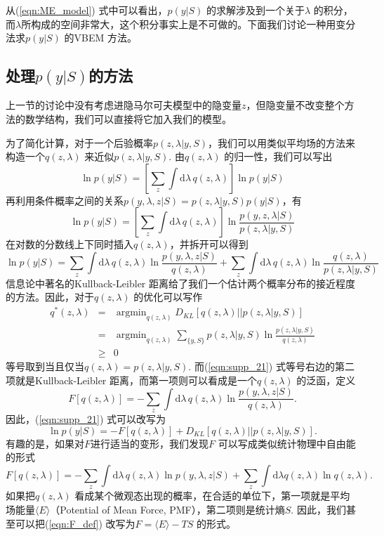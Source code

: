 \documentclass[11pt, a4paper]{article}
\DeclareMathOperator*{\argmin}{argmin}
\begin{document}
    从(\ref{eqn:ME_model}) 式中可以看出，$p(y|S)$ 的求解涉及到一个关于$\lambda$ 的积分，而$\lambda$所构成的空间非常大，这个积分事实上是不可做的。下面我们讨论一种用变分法求$p(y|S)$ 的VBEM 方法。

    \subsection{处理$p(y|S)$的方法}
    上一节的讨论中没有考虑进隐马尔可夫模型中的隐变量$z$，但隐变量不改变整个方法的数学结构，我们可以直接将它加入我们的模型。

    为了简化计算，对于一个后验概率$p(z,\lambda|y, S)$，我们可以用类似平均场的方法来构造一个$q(z,\lambda)$ 来近似$p(z,\lambda|y, S)$. 由$q(z,\lambda)$ 的归一性，我们可以写出
    $$\ln p(y|S) = \left[\sum_z\int \mathrm d\lambda\, q(z,\lambda)\right]\ln p(y|S)$$
    再利用条件概率之间的关系$p(y,\lambda,z|S) = p(z,\lambda|y, S)p(y|S)$，有
    $$\ln p(y|S) = \left[\sum_z\int \mathrm d\lambda\, q(z,\lambda)\right]\ln \frac{p(y,z,\lambda|S)}{p(z,\lambda|y,S)}$$
    在对数的分数线上下同时插入$q(z,\lambda)$，并拆开可以得到
    \begin{equation}\label{eqn:supp_21}
      \ln p(y|S) = \sum_z\int \mathrm d\lambda\, q(z,\lambda)\ln\frac{p(y,\lambda,z|S)}{q(z,\lambda)}+\sum_z\int \mathrm d\lambda\, q(z,\lambda)\ln\frac{q(z,\lambda)}{p(z,\lambda|y,S)}
    \end{equation}
    信息论中著名的Kullback-Leibler 距离给了我们一个估计两个概率分布的接近程度的方法。因此，对于$q(z,\lambda)$ 的优化可以写作
    \begin{eqnarray*}
      q^*(z,\lambda) &=& \argmin_{q(z,\lambda)} D_{KL}[q(z,\lambda) || p(z,\lambda|y,S)] \\
                    &=& \argmin_{q(z,\lambda)}\sum_{\{y,S\}} p(z,\lambda|y,S)\ln\frac{p(z,\lambda|y,S)}{q(z,\lambda)}\\
                    &\ge& 0
    \end{eqnarray*}
    等号取到当且仅当$q(z,\lambda) = p(z,\lambda|y, S)$. 而(\ref{eqn:supp_21}) 式等号右边的第二项就是Kullback-Leibler 距离，而第一项则可以看成是一个$q(z,\lambda)$ 的泛函，定义
    \begin{equation}\label{eqn:F_def}
      F[q(z,\lambda)] = -\sum_z\int \mathrm d\lambda\, q(z,\lambda)\ln\frac{p(y,\lambda,z|S)}{q(z,\lambda)}.
    \end{equation}
    因此，(\ref{eqn:supp_21}) 式可以改写为
    \begin{equation}\label{eqn:supp_24}
      \ln p(y|S)= -F[q(z,\lambda)] +D_{KL}[q(z,\lambda)||p(z,\lambda| y, S)].
    \end{equation}
    有趣的是，如果对$F$进行适当的变形，我们发现$F$ 可以写成类似统计物理中自由能的形式
    $$F[q(z,\lambda)] = -\sum_z\int \mathrm d\lambda\, q(z,\lambda)\ln p(y,\lambda,z|S) + \sum_z\int \mathrm d\lambda q(z,\lambda)\ln q(z,\lambda).$$
    如果把$q(z,\lambda)$ 看成某个微观态出现的概率，在合适的单位下，第一项就是平均场能量$\langle E\rangle$（Potential of Mean Force, PMF），第二项则是统计熵$S$. 因此，我们甚至可以把(\ref{eqn:F_def}) 改写为$F=\langle E\rangle -TS$ 的形式。
\end{document}
